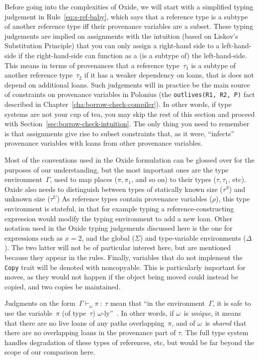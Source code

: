 \documentclass[11pt,a4paper,twoside,openany,draft]{report}
\newcommand{\InRust}[1]{\texttt{#1}}
\newcommand{\InDatalog}[1]{\texttt{#1}}
\newcommand{\expression}[1]{\boxed{#1}}
\newcommand{\decoline}{%
   \par
   \vspace{\baselineskip}
   \hfill
   \ding{100}
   \hfill
   \vspace{\baselineskip}
\par}
\begin{document}
Before going into the complexities of Oxide, we will start with a simplified
typing judgement in Rule~\eqref{eq:s-ref-baby}, which says that a reference type
is a subtype of another reference type iff their provenance variables are a
subset. These typing judgements are implied on assignments with the intuition
(based on Liskov's Substitution Principle) that you can only assign a right-hand
side to a left-hand-side if the right-hand-side can function as a (is a subtype
of) the left-hand-side. This means in terms of provenances that a reference
type~$\tau_1$ is a subtype of another reference type~$\tau_2$ if it has a weaker
dependency on loans, that is does not depend on additional loans. Such
judgements will in practice be the main source of constraints on provenance
variables in Polonius (the \InDatalog{outlives(R1, R2, P)} fact described in
Chapter~\ref{cha:borrow-check-compiler}). In other words, if type systems are
not your cup of tea, you may skip the rest of this section and proceed with
Section~\ref{sec:borrow-check-intuition}. The only thing you need to remember is
that assignments give rise to subset constraints that, as it were, ``infects''
provenance variables with loans from other provenance variables.

\decoline{}

Most of the conventions used in the Oxide formulation can be glossed over for
the purposes of our understanding, but the most important ones are the type
environment~$\Gamma$, used to map places ($\pi, \pi_1$, and so on) to their
types ($\tau, \tau_1$, etc). Oxide also needs to distinguish between types of
statically known size ($\tau^S$) and unknown size ($\tau^U$) As reference types
contain provenance variables ($\rho$), this type environment is stateful, in
that for example typing a reference-constructing expression would modify the
typing environment to add a new loan. Other notation used in the Oxide typing
judgements discussed here is the one for $\expression{\text{expressions}}$ such
as $\expression{x = 2}$, and the global ($\Sigma$) and type-variable
environments ($\Delta$). The two latter will not be of particular interest here,
but are mentioned because they appear in the rules. Finally, variables that do
not implement the \InRust{Copy} trait will be denoted with $\text{noncopyable}$.
This is particularly important for moves, as they would not happen if the object
being moved could instead be copied, and two copies be maintained.


Judgments on the form~$\Gamma \vdash_{\omega} \pi \: : \: \tau$ mean that ``in
the environment~$\Gamma$, it is safe to use the variable~$\pi$ (of type~$\tau$)
$\omega$-ly''~\cite{weiss_oxide:_2019}. In other words, if $\omega$~is
\emph{unique}, it means that there are no live loans of any paths
overlapping~$\pi$, and of $\omega$~is \emph{shared} that there are no
overlapping loans in the provenance part of $\tau$. The full type system handles
degradation of these types of references, etc, but would be far beyond the scope
of our comparison here.
\end{document}
